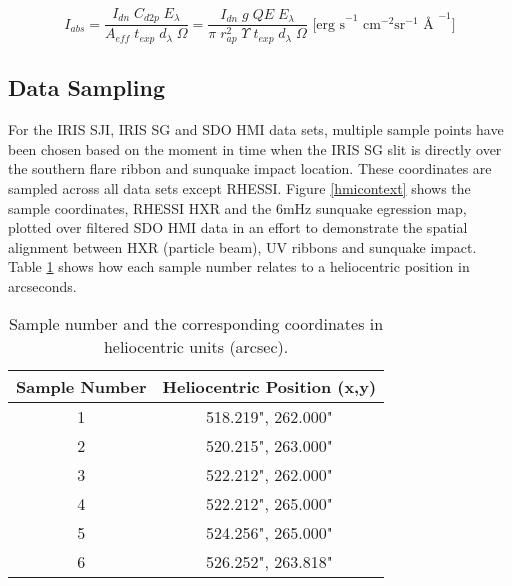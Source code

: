 \begin{equation}\label{hmiradiometriccal}
I_{abs} = \frac{I_{dn} \; C_{d2p} \; E_{\lambda}}{A_{eff} \; t_{exp} \; d_{\lambda} \; \Omega} 
        = \frac{I_{dn} \; g \; QE \; E_{\lambda}}{\pi \; r_{ap}^{2} \; \Upsilon \; t_{exp} \; d_{\lambda} \; \Omega} \text{ [erg s}^{-1}\text{ cm}^{-2}\text{sr}^{-1}\text{ \AA\ }^{-1}]
\end{equation}


\subsection{Data Sampling}
For the IRIS SJI, IRIS SG and SDO HMI data sets, multiple sample points have been chosen based on the moment in time when the IRIS SG slit is directly over the southern flare ribbon and sunquake impact location. These coordinates are sampled across all data sets except RHESSI. Figure \ref{hmicontext} shows the sample coordinates, RHESSI HXR and the 6mHz sunquake egression map, plotted over filtered SDO HMI data in an effort to demonstrate the spatial alignment between HXR (particle beam), UV ribbons and sunquake impact. Table \ref{coordtab} shows how each sample number relates to a heliocentric position in arcseconds.


\begin{table}[h]
\centering
\begin{tabular}{|c|c|}
\hline
Sample Number & Heliocentric Position (x,y)\\
\hline
1 & 518.219", 262.000"\\
2 & 520.215", 263.000"\\
3 & 522.212", 262.000"\\
4 & 522.212", 265.000"\\
5 & 524.256", 265.000"\\
6 & 526.252", 263.818"\\
\hline
\end{tabular}
\caption{Sample number and the corresponding coordinates in heliocentric units (arcsec).}\label{coordtab}
\end{table}



